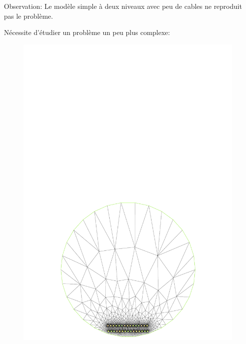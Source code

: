 \begin{frame}
Observation: Le modèle simple à deux niveaux avec peu de cables ne reproduit pas le problème. 

Nécessite d'étudier un problème un peu plus complexe:
  \begin{figure}
    \includegraphics[scale=0.15]{../figs/bigcircle}  \hspace{1pt}

\end{figure}
\end{frame}
